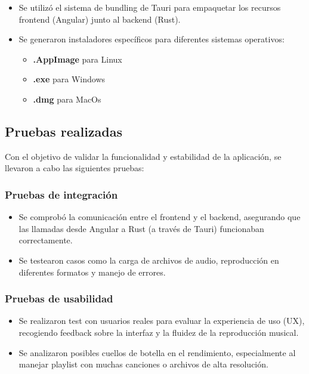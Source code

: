 \documentclass[11pt, a4paper]{article}
\begin{document}
        \begin{itemize}
            \item Se utilizó el sistema de bundling de Tauri para empaquetar los recursos frontend (Angular) junto al backend (Rust).
            \item Se generaron instaladores específicos para diferentes sistemas operativos: \begin{itemize}
                \item \textbf{.AppImage} para Linux
                \item \textbf{.exe} para Windows
                \item \textbf{.dmg} para MacOs
                \end{itemize}
        \end{itemize}

        \subsection{Pruebas realizadas}

        Con el objetivo de validar la funcionalidad y estabilidad de la aplicación, se llevaron a cabo las siguientes pruebas:

            \subsubsection{Pruebas de integración}

            \begin{itemize}
                \item Se comprobó la comunicación entre el frontend y el backend, asegurando que las llamadas desde Angular a Rust (a través de Tauri) funcionaban correctamente.
                \item Se testearon casos como la carga de archivos de audio, reproducción en diferentes formatos y manejo de errores.
            \end{itemize}

            \subsubsection{Pruebas de usabilidad}

            \begin{itemize}
                \item Se realizaron test con usuarios reales para evaluar la experiencia de uso (UX), recogiendo feedback sobre la interfaz y la fluidez de la reproducción musical.
                \item Se analizaron posibles cuellos de botella en el rendimiento, especialmente al manejar playlist con muchas canciones o archivos de alta resolución.
            \end{itemize}
\end{document}
